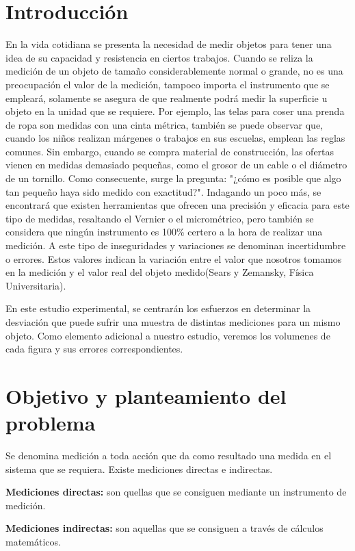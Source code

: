 \documentclass[%
 reprint,
groupedaddress,
unsortedaddress,
 amsmath,amssymb,
 aps,
superscriptaddress
]{revtex4-2}
\begin{document}
\section{Introducción}
\label{sec:introduccion}
En la vida cotidiana se presenta la necesidad de medir objetos para tener una idea de su capacidad y resistencia en ciertos trabajos. Cuando se reliza la medición de un objeto de tamaño considerablemente normal o grande, no es una preocupación el valor de la medición, tampoco importa el instrumento que se empleará, solamente se asegura de que realmente podrá medir la superficie u objeto en la unidad que se requiere. Por ejemplo, las telas para coser una prenda de ropa son medidas con una cinta métrica, también se puede observar que, cuando los niños realizan márgenes o trabajos en sus escuelas, emplean las reglas comunes. Sin embargo, cuando se compra material de construcción, las ofertas vienen en medidas demasiado pequeñas, como el grosor de un cable o el diámetro de un tornillo. Como consecuente, surge la pregunta: "¿cómo es posible que algo tan pequeño haya sido medido con exactitud?". 
Indagando un poco más, se encontrará que existen herramientas que ofrecen una precisión y eficacia para este tipo de medidas, resaltando el Vernier o el micrométrico, pero también se considera que ningún instrumento es 100\% certero a la hora de realizar una medición. A este tipo de inseguridades y variaciones se denominan incertidumbre o errores. Estos valores indican la variación entre el valor que nosotros tomamos en la medición y el valor real del objeto medido(Sears y Zemansky, Física Universitaria). 

En este estudio experimental, se centrarán los esfuerzos en  determinar la desviación que puede sufrir una muestra de distintas mediciones para un mismo objeto. Como elemento adicional a nuestro estudio, veremos los volumenes de cada figura y sus errores correspondientes.
 


\section{Objetivo y planteamiento del problema}
\label{obj_plant}
Se denomina medición a toda acción que da como resultado una medida en el sistema que se requiera. Existe mediciones directas e indirectas.  

\textbf{Mediciones directas:} son quellas que se consiguen mediante un instrumento de medición.  

\textbf{Mediciones indirectas:} son aquellas que se consiguen a través de cálculos matemáticos.
\end{document}
